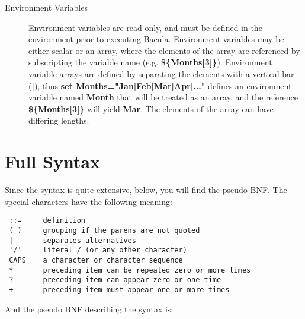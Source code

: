 \begin{description}
\item [Environment Variables]
   Environment variables are read-only,  and must be defined in the environment
prior to executing Bacula.  Environment variables may be either scalar or an
array, where the  elements of the array are referenced by subscripting the
variable  name (e.g. {\bf \$\{Months[3]\}}). Environment variable arrays are 
defined by separating the elements with a vertical bar ({\bf |}),  thus {\bf
set Months="Jan|Feb|Mar|Apr|..."} defines  an environment variable named
{\bf Month} that will be  treated as an array, and the reference {\bf
\$\{Months[3]\}} will  yield {\bf Mar}. The elements of the array can have 
differing lengths. 
\end{description}

\section{Full Syntax}

Since the syntax is quite extensive, below, you will find the pseudo BNF. The
special characters have the following meaning: 

\footnotesize
\begin{verbatim}
 ::=     definition
 ( )     grouping if the parens are not quoted
 |       separates alternatives
 '/'     literal / (or any other character)
 CAPS    a character or character sequence
 *       preceding item can be repeated zero or more times
 ?       preceding item can appear zero or one time
 +       preceding item must appear one or more times
\end{verbatim}
\normalsize

And the pseudo BNF describing the syntax is: 

